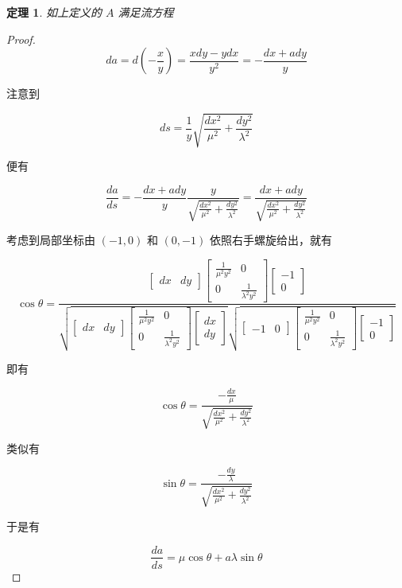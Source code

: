 \documentclass[a4paper,12pt]{article}
\numberwithin{definition}{section}
\numberwithin{lemma}{section}
\numberwithin{proposition}{section}
\newtheorem{theorem}{定理}
\numberwithin{theorem}{section}
\numberwithin{grammar}{section}
\numberwithin{program}{section}
\numberwithin{convention}{section}
\numberwithin{corollary}{section}
\begin{document}
\begin{theorem}
如上定义的 $A$ 满足流方程
\end{theorem}

\begin{proof}
$$
da = d(-\frac{x}{y}) = \frac{xdy - ydx}{y^2} = -\frac{dx + a dy}{y}
$$

注意到

$$
ds = \frac{1}{y}\sqrt{\frac{dx^2}{\mu^2} + \frac{dy^2}{\lambda^2}}
$$

便有

$$
\frac{da}{ds} = - \frac{dx + a dy}{y} \frac{y}{\sqrt{\frac{dx^2}{\mu^2} + \frac{dy^2}{\lambda^2}}} = \frac{dx + a dy}{\sqrt{\frac{dx^2}{\mu^2} + \frac{dy^2}{\lambda^2}}}
$$

考虑到局部坐标由 $(-1, 0)$ 和 $(0, -1)$ 依照右手螺旋给出，就有

$$
\cos \theta = \frac{\begin{bmatrix} dx & dy \end{bmatrix} \begin{bmatrix} \frac{1}{\mu^2 y^2} & 0 \\ 0 & \frac{1}{\lambda^2 y^2} \end{bmatrix} \begin{bmatrix} -1 \\ 0 \end{bmatrix}}{\sqrt{\begin{bmatrix} dx & dy \end{bmatrix} \begin{bmatrix} \frac{1}{\mu^2 y^2} & 0 \\ 0 & \frac{1}{\lambda^2 y^2} \end{bmatrix} \begin{bmatrix} dx \\ dy \end{bmatrix}}\sqrt{\begin{bmatrix} -1 & 0 \end{bmatrix} \begin{bmatrix} \frac{1}{\mu^2 y^2} & 0 \\ 0 & \frac{1}{\lambda^2 y^2} \end{bmatrix} \begin{bmatrix} -1 \\ 0 \end{bmatrix}}}
$$

即有

$$
\cos \theta = \frac{-\frac{dx}{\mu}}{\sqrt{\frac{dx^2}{\mu^2} + \frac{dy^2}{\lambda^2}}}
$$

类似有

$$
\sin \theta = \frac{-\frac{dy}{\lambda}}{\sqrt{\frac{dx^2}{\mu^2} + \frac{dy^2}{\lambda^2}}}
$$

于是有

$$
\frac{da}{ds} = \mu \cos \theta + a \lambda \sin \theta
$$

\end{proof}
\end{document}
